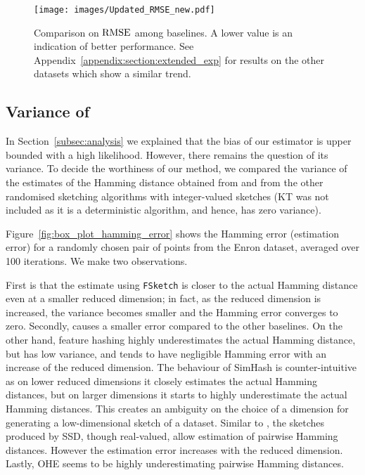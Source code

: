 \begin{figure*}
\centering
\texttt{[image: images/Updated\_RMSE\_new.pdf]}
\caption{{Comparison on $\mathrm{RMSE}$ among baselines. A lower value is an indication of better performance.  See Appendix~\ref{appendix:section:extended_exp} for results on the other datasets which show a similar trend. %
}}
\label{fig:rmse}
\end{figure*}



\subsection{Variance of \fsketch}
In Section~\ref{subsec:analysis} we explained that the bias of our estimator is upper bounded with a high likelihood. However, there remains the question of its variance. To decide the worthiness of our method, we compared the variance of the estimates of the Hamming distance obtained from \fsketch and from the other randomised sketching algorithms with integer-valued sketches (KT was not included as it is a deterministic algorithm, and hence, has zero variance).

Figure~\ref{fig:box_plot_hamming_error} shows the Hamming error (estimation error) for a randomly chosen pair of points from the Enron dataset, averaged over 100 iterations. 
We make two observations.

First is that the estimate using \texttt{FSketch} is closer to the actual Hamming distance even at a smaller
reduced dimension; in fact, as the reduced dimension is increased, the variance
becomes smaller and the Hamming error converges to zero. Secondly, \fsketch causes a smaller error compared to the other baselines. On the other hand, {feature hashing} highly underestimates the actual Hamming distance, but has low variance, and tends to have negligible Hamming error with an increase of the reduced dimension. The behaviour of {SimHash} is counter-intuitive as on lower reduced dimensions it closely estimates the actual Hamming distances, but on larger dimensions it starts to highly underestimate the actual Hamming distances. This creates an ambiguity on the choice of a dimension for generating a low-dimensional sketch of a dataset.%
 Similar to \fsketch, the sketches produced by SSD, though real-valued, allow estimation of pairwise Hamming distances. However the estimation error increases with the reduced dimension. Lastly, OHE seems to be highly underestimating pairwise Hamming distances. 

